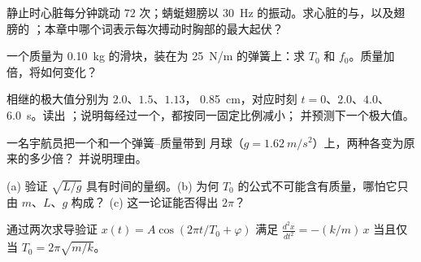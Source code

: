 \begin{exercise}[$\star$]\label{exo:g12:oscillators-and-time:2}
静止时心脏每分钟跳动 $72$ 次；蜻蜓翅膀以
\qty{30}{Hz} 的振动。求心脏的与，以及翅膀的
；本章中哪个词表示每次搏动时胸部的最大起伏？
\end{exercise}

\begin{exercise}[$\star$]\label{exo:g12:oscillators-and-time:3}
一个质量为 \qty{0.10}{kg} 的滑块，装在为 \qty{25}{N/m} 的弹簧上：求 $T_0$
和 $f_0$。质量加倍，将如何变化？
\end{exercise}

\begin{exercise}[$\star$]\label{exo:g12:oscillators-and-time:4}
相继的极大值分别为 $2.0$、$1.5$、$1.13$，
\qty{0.85}{cm}，对应时刻 $t = 0$、$2.0$、$4.0$、\qty{6.0}{s}。读出
；说明每经过一个，都按同一固定比例减小；
并预测下一个极大值。
\end{exercise}

\begin{exercise}[$\star$]\label{exo:g12:oscillators-and-time:5}
一名宇航员把一个和一个弹簧–质量带到
月球（$g = \qty{1.62}{m/s^2}$）上，两种各变为原来的多少倍？
并说明理由。
\end{exercise}

\begin{exercise}[$\star\star$]\label{exo:g12:oscillators-and-time:6}
(a) 验证 $\sqrt{L/g}$ 具有时间的量纲。(b)
为何 $T_0$ 的公式不可能含有质量，哪怕它只由 $m$、$L$、$g$ 构成？
(c) 这一论证能否得出 $2\pi$？
\end{exercise}

\begin{exercise}[$\star\star$]\label{exo:g12:oscillators-and-time:7}
通过两次求导验证 $x(t) = A\cos(2\pi t/T_0 +
\varphi)$ 满足 $\frac{d^2x}{dt^2} = -(k/m)\,x$ 当且仅当
$T_0 = 2\pi\sqrt{m/k}$。
\end{exercise}

